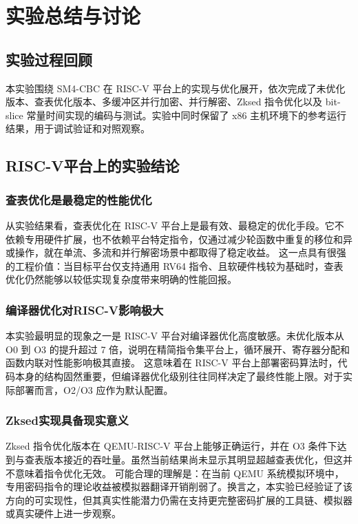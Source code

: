 \section{实验总结与讨论}

\subsection{实验过程回顾}

本实验围绕 SM4-CBC 在 RISC-V 平台上的实现与优化展开，依次完成了未优化版本、查表优化版本、多缓冲区并行加密、并行解密、Zksed 指令优化以及 bit-slice 常量时间实现的编码与测试。实验中同时保留了 x86 主机环境下的参考运行结果，用于调试验证和对照观察。

\subsection{RISC-V平台上的实验结论}

\subsubsection{查表优化是最稳定的性能优化}

从实验结果看，查表优化在 RISC-V 平台上是最有效、最稳定的优化手段。它不依赖专用硬件扩展，也不依赖平台特定指令，仅通过减少轮函数中重复的移位和异或操作，就在单流、多流和并行解密场景中都取得了稳定收益。
这一点具有很强的工程价值：当目标平台仅支持通用 RV64 指令、且软硬件栈较为基础时，查表优化仍然能够以较低实现复杂度带来明确的性能回报。

\subsubsection{编译器优化对RISC-V影响极大}
本实验最明显的现象之一是 RISC-V 平台对编译器优化高度敏感。未优化版本从 O0 到 O3 的提升超过 7 倍，说明在精简指令集平台上，循环展开、寄存器分配和函数内联对性能影响极其直接。
这意味着在 RISC-V 平台上部署密码算法时，代码本身的结构固然重要，但编译器优化级别往往同样决定了最终性能上限。对于实际部署而言，O2/O3 应作为默认配置。

\subsubsection{Zksed实现具备现实意义}
Zksed 指令优化版本在 QEMU-RISC-V 平台上能够正确运行，并在 O3 条件下达到与查表版本接近的吞吐量。虽然当前结果尚未显示其明显超越查表优化，但这并不意味着指令优化无效。
可能合理的理解是：在当前 QEMU 系统模拟环境中，专用密码指令的理论收益被模拟器翻译开销削弱了。换言之，本实验已经验证了该方向的可实现性，但其真实性能潜力仍需在支持更完整密码扩展的工具链、模拟器或真实硬件上进一步观察。

